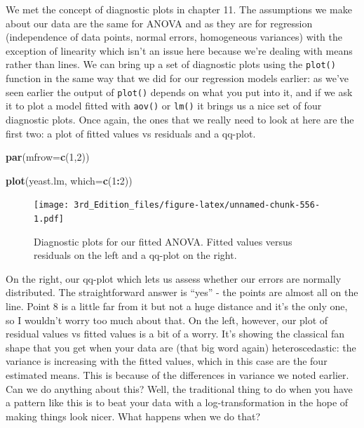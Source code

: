 \documentclass[
]{book}
\newenvironment{Shaded}{\begin{snugshade}}{\end{snugshade}}
\newcommand{\DataTypeTok}[1]{\textcolor[rgb]{0.13,0.29,0.53}{#1}}
\newcommand{\DecValTok}[1]{\textcolor[rgb]{0.00,0.00,0.81}{#1}}
\newcommand{\KeywordTok}[1]{\textcolor[rgb]{0.13,0.29,0.53}{\textbf{#1}}}
\newcommand{\NormalTok}[1]{#1}
\newcommand{\OperatorTok}[1]{\textcolor[rgb]{0.81,0.36,0.00}{\textbf{#1}}}
\begin{document}
We met the concept of diagnostic plots in chapter 11. The assumptions we make about our data are the same for ANOVA and as they are for regression (independence of data points, normal errors, homogeneous variances) with the exception of linearity which isn't an issue here because we're dealing with means rather than lines. We can bring up a set of diagnostic plots using the \texttt{plot()} function in the same way that we did for our regression models earlier: as we've seen earlier the output of \texttt{plot()} depends on what you put into it, and if we ask it to plot a model fitted with \texttt{aov()} or \texttt{lm()} it brings us a nice set of four diagnostic plots. Once again, the ones that we really need to look at here are the first two: a plot of fitted values vs residuals and a qq-plot.

\begin{Shaded}
\begin{Highlighting}[]

\KeywordTok{par}\NormalTok{(}\DataTypeTok{mfrow=}\KeywordTok{c}\NormalTok{(}\DecValTok{1}\NormalTok{,}\DecValTok{2}\NormalTok{))}

\KeywordTok{plot}\NormalTok{(yeast.lm, }\DataTypeTok{which=}\KeywordTok{c}\NormalTok{(}\DecValTok{1}\OperatorTok{:}\DecValTok{2}\NormalTok{))}
\end{Highlighting}
\end{Shaded}

\begin{figure}
\centering
\texttt{[image: 3rd\_Edition\_files/figure-latex/unnamed-chunk-556-1.pdf]}
\caption{\label{fig:unnamed-chunk-556}Diagnostic plots for our fitted ANOVA. Fitted values versus residuals on the left and a qq-plot on the right.}
\end{figure}

On the right, our qq-plot which lets us assess whether our errors are normally distributed. The straightforward answer is ``yes'' - the points are almost all on the line. Point 8 is a little far from it but not a huge distance and it's the only one, so I wouldn't worry too much about that. On the left, however, our plot of residual values vs fitted values is a bit of a worry. It's showing the classical fan shape that you get when your data are (that big word again) heteroscedastic: the variance is increasing with the fitted values, which in this case are the four estimated means. This is because of the differences in variance we noted earlier. Can we do anything about this? Well, the traditional thing to do when you have a pattern like this is to beat your data with a log-transformation in the hope of making things look nicer. What happens when we do that?
\end{document}
